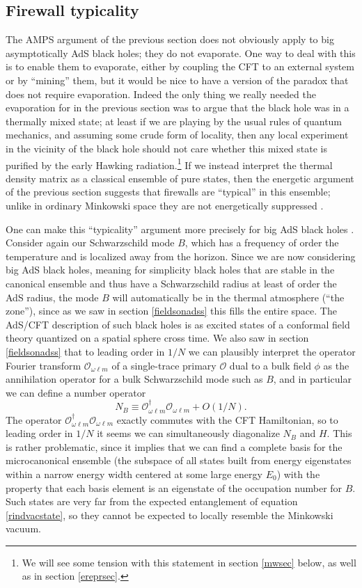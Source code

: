 \documentclass[12pt]{article}
\newcommand{\be}{\begin{equation}}
\newcommand{\ee}{\end{equation}}
\newcommand{\mO}{\mathcal{O}}
\begin{document}
\subsection{Firewall typicality}\label{ftypsec}
The AMPS argument of the previous section does not obviously apply to big asymptotically AdS black holes; they do not evaporate.  One way to deal with this is to enable them to evaporate, either by coupling the CFT to an external system or by ``mining'' them, but it would be nice to have a version of the paradox that does not require evaporation.  Indeed the only thing we really needed the evaporation for in the previous section was to argue that the black hole was in a thermally mixed state; at least if we are playing by the usual rules of quantum mechanics, and assuming some crude form of locality, then any local experiment in the vicinity of the black hole should not care whether this mixed state is purified by the early Hawking radiation.\footnote{We will see some tension with this statement in section \ref{mwsec} below, as well as in section \ref{ereprsec}.}  If we instead interpret the thermal density matrix as a classical ensemble of pure states, then the energetic argument of the previous section suggests that firewalls are ``typical'' in this ensemble; unlike in ordinary Minkowski space they are not energetically suppressed \cite{Bousso:2013wia}. 

One can make this ``typicality'' argument more precisely for big AdS black holes \cite{Marolf:2013dba}.  Consider again our Schwarzschild mode $B$, which has a frequency of order the temperature and is localized away from the horizon.  Since we are now considering big AdS black holes, meaning for simplicity black holes that are stable in the canonical ensemble and thus have a Schwarzschild radius at least of order the AdS radius, the mode $B$ will automatically be in the thermal atmosphere (``the zone''), since as we saw in section \ref{fieldsonadss} this fills the entire space.  The AdS/CFT description of such black holes is as excited states of a conformal field theory quantized on a spatial sphere cross time.  We also saw in section \ref{fieldsonadss} that to leading order in $1/N$ we can plausibly interpret the operator Fourier transform $\mO_{\omega \ell m}$ of a single-trace primary $\mO$ dual to a bulk field $\phi$ as the annihilation operator for a bulk Schwarzschild mode such as $B$, and in particular we can define a number operator
\be
N_B\equiv \mO_{\omega \ell m}^\dagger\mO_{\omega \ell m}+O(1/N).
\ee  
The operator $\mO_{\omega \ell m}^\dagger\mO_{\omega \ell m}$ exactly commutes with the CFT Hamiltonian, so to leading order in $1/N$ it seems we can simultaneously diagonalize $N_B$ and $H$.  This is rather problematic, since it implies that we can find a complete basis for the microcanonical ensemble (the subspace of all states built from energy eigenstates within a narrow energy width centered at some large energy $E_0$) with the property that each basis element is an eigenstate of the occupation number for $B$.  Such states are very far from the expected entanglement of equation \eqref{rindvacstate}, so they cannot be expected to locally resemble the Minkowski vacuum.  
\end{document}

